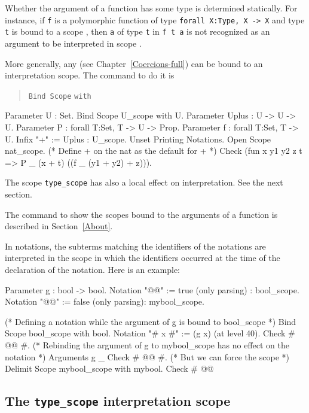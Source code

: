 Whether the argument of a function has some type {\type} is determined
statically. For instance, if {\tt f} is a polymorphic function of type
{\tt forall X:Type, X -> X} and type {\tt t} is bound to a scope
{\scope}, then {\tt a} of type {\tt t} in {\tt f~t~a} is not
recognized as an argument to be interpreted in scope {\scope}.

More generally, any {\class} (see Chapter~\ref{Coercions-full}) can be
bound to an interpretation scope. The command to do it is
\begin{quote}
{\tt Bind Scope} {\scope} \texttt{with} {\class}
\end{quote}

\Example
\begin{coq_example}
Parameter U : Set.
Bind Scope U_scope with U.
Parameter Uplus : U -> U -> U.
Parameter P : forall T:Set, T -> U -> Prop.
Parameter f : forall T:Set, T -> U.
Infix "+" := Uplus : U_scope.
Unset Printing Notations.
Open Scope nat_scope. (* Define + on the nat as the default for + *)
Check (fun x y1 y2 z t => P _ (x + t) ((f _ (y1 + y2) + z))).
\end{coq_example}

\Rem The scope {\tt type\_scope} has also a local effect on
interpretation. See the next section.

\SeeAlso The command to show the scopes bound to the arguments of a
function is described in Section~\ref{About}.

\Rem In notations, the subterms matching the identifiers of the
notations are interpreted in the scope in which the identifiers
occurred at the time of the declaration of the notation. Here is an
example:

\begin{coq_example}
Parameter g : bool -> bool.
Notation "@@" := true (only parsing) : bool_scope.
Notation "@@" := false (only parsing): mybool_scope.

(* Defining a notation while the argument of g is bound to bool_scope *)
Bind Scope bool_scope with bool.
Notation "# x #" := (g x) (at level 40).
Check # @@ #.
(* Rebinding the argument of g to mybool_scope has no effect on the notation *)
Arguments g _%
Check # @@ #.
(* But we can force the scope *)
Delimit Scope mybool_scope with mybool.
Check # @@%
\end{coq_example}

\subsection[The {\tt type\_scope} interpretation scope]{The {\tt type\_scope} interpretation scope}

